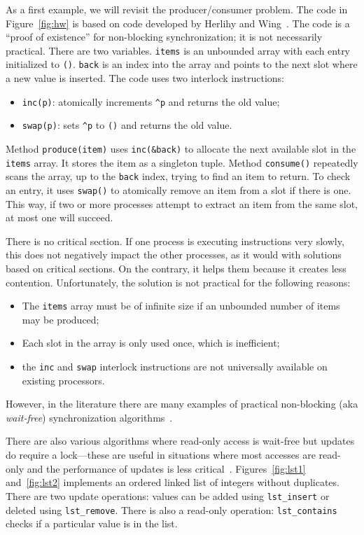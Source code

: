 \documentclass{report}
\begin{document}
As a first example, we will revisit the producer/consumer problem.
The code in Figure~\ref{fig:hw} is based on code developed by Herlihy and
Wing~\cite{HW87}.
The code is a ``proof of existence'' for non-blocking synchronization; it
is not necessarily practical.
There are two variables.  \texttt{items} is an unbounded array with each
entry initialized to \texttt{()}.  \texttt{back} is an index into the
array and points to the next slot where a new value is inserted.
The code uses two interlock instructions:
\begin{itemize}
\item \texttt{inc(p)}: atomically increments \texttt{\^{}p} and returns
the old value;
\item \texttt{swap(p)}: sets \texttt{\^{}p} to \texttt{()} and returns
the old value.
\end{itemize}

Method \texttt{produce(item)} uses \texttt{inc(\&back)} to allocate
the next available slot in the \texttt{items} array.
It stores the item as a singleton tuple.
Method \texttt{consume()} repeatedly scans the array, up to the
\texttt{back} index, trying to find an item to return.
To check an entry, it uses \texttt{swap()}
to atomically remove an item from a slot if there is one.
This way, if two or more processes attempt to extract an item from
the same slot, at most one will succeed.

There is no critical section.  If one process is executing instructions
very slowly, this does not negatively impact the other processes, as it
would with solutions based on critical sections.
On the contrary, it helps them because it creates less contention.
Unfortunately, the solution is not practical for the following reasons:
\begin{itemize}
\item The \texttt{items} array must be of infinite size if an unbounded number
of items may be produced;
\item Each slot in the array is only used once, which is inefficient;
\item the \texttt{inc} and \texttt{swap} interlock instructions are not
universally available on existing processors.
\end{itemize}
However, in the literature there are many examples of practical
non-blocking (aka \emph{wait-free})
synchronization algorithms~\cite{}.

There are also various algorithms where read-only access is wait-free
but updates do require a lock---these are useful in situations where
most accesses are read-only and the performance of updates is less
critical~\cite{}.
Figures~\ref{fig:lst1} and~\ref{fig:lst2} implements an ordered linked
list of integers without duplicates.
There are two update operations:
values can be added using \texttt{lst\_insert} or deleted using
\texttt{lst\_remove}.
There is also a read-only operation: \texttt{lst\_contains} checks if
a particular value is in the list.
\end{document}
